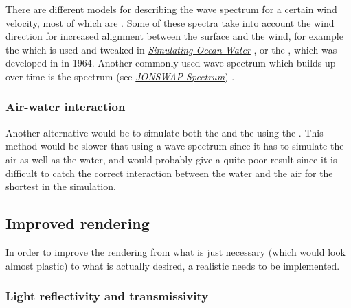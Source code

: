 There are different models for describing the wave spectrum for a certain wind velocity, most of which are \empirical. Some of these spectra take into account the wind direction for increased alignment between the surface and the wind, for example the  which is used and tweaked in \textit{\href{http://graphics.ucsd.edu/courses/rendering/2005/jdewall/tessendorf.pdf}{Simulating Ocean Water}} \citep{temp}, or the , which was developed in  \citep{temp} in 1964. Another commonly used wave spectrum which builds up over time is the \JONSWAP spectrum (see \textit{\href{http://www.wikiwaves.org/Ocean-Wave\_Spectra\#JONSWAP\_Spectrum}{JONSWAP Spectrum}}) \citep{temp}.

\subsubsection{Air-water interaction}

Another alternative would be to simulate both the \water and the \air using the \FVM. This method would be slower that using a wave spectrum since it has to simulate the air as well as the water, and would probably give a quite poor result since it is difficult to catch the correct interaction between the water and the air for the shortest \wavelengths in the simulation.

\HRule















\subsection{Improved rendering}

In order to improve the rendering from what is just necessary (which would look almost plastic) to what is actually desired, a realistic  needs to be implemented.

\subsubsection{Light reflectivity and transmissivity}

